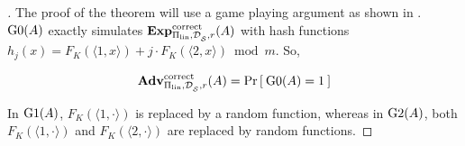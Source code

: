\begin{proof}[]
The proof of the theorem will use a game playing argument as shown in . $\text{G0}(A)$ exactly simulates $\mathrm{\mathbf{Exp}}^{\mathrm{correct}}_{\Pi_\mathrm{lin},\mathcal{D}_{{\cal S}}^{},r}(A)$ with hash functions $h_j(x) =  F_{K}(\langle 1,x \rangle) + j\cdot F_{K}(\langle 2,x \rangle) \bmod m$. So,

\begin{equation}
\mathrm{\mathbf{Adv}}^{\mathrm{correct}}_{\Pi_{\mathrm{lin}},\mathcal{D}_{{\cal S}}^{},r}(A) = \Pr\left[\: \text{G0}(A)=1 \:\right]\label{eq:0}
\end{equation}

 In $\text{G1}(A)$, $F_{K}(\langle 1,\cdot \rangle)$ is replaced by a random function, whereas in $\text{G2}(A)$, both $F_{K}(\langle 1,\cdot \rangle)$ and $F_{K}(\langle 2, \cdot \rangle)$ are replaced by random functions.


\end{proof}
